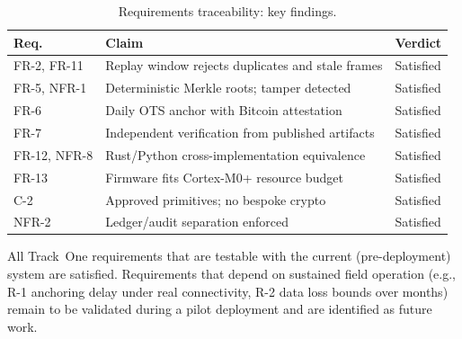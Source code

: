 \begin{table}[H]
    \centering
    \caption{Requirements traceability: key findings.}
    \label{tab:req-verdict}
    \small
    \begin{tabularx}{\textwidth}{l X l}
\toprule
\textbf{Req.} & \textbf{Claim} & \textbf{Verdict} \\
\midrule
FR-2, FR-11  & Replay window rejects duplicates and stale frames
& Satisfied \\
FR-5, NFR-1  & Deterministic Merkle roots; tamper detected
& Satisfied \\
FR-6         & Daily \ac{OTS} anchor with Bitcoin attestation
& Satisfied \\
FR-7         & Independent verification from published artifacts
& Satisfied \\
FR-12, NFR-8 & Rust/Python cross-implementation equivalence
& Satisfied \\
FR-13        & Firmware fits Cortex-M0+ resource budget
& Satisfied \\
C-2          & Approved primitives; no bespoke crypto
& Satisfied \\
NFR-2        & Ledger/audit separation enforced
& Satisfied \\
\bottomrule
    \end{tabularx}
\end{table}

All Track~One requirements that are testable with the current
(pre-deployment) system are satisfied.
Requirements that depend on
sustained field operation (e.g., R-1 anchoring delay under real
connectivity, R-2 data loss bounds over months) remain to be
validated during a pilot deployment and are identified as future
work.

